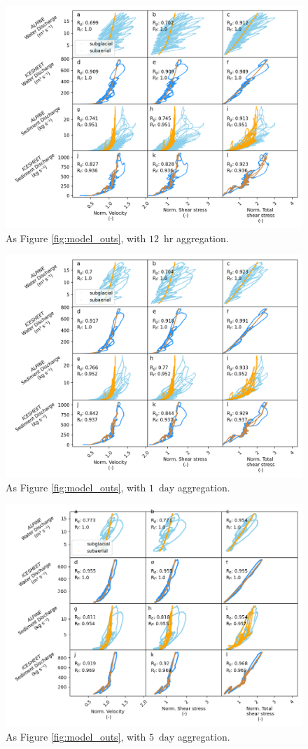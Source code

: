 \documentclass[11pt]{article}
\newcommand{\unit}[1]{$\mathrm{#1}$}
\begin{document}
\begin{center}
  \begin{figure}[h]
    \includegraphics[width=0.7\linewidth]{Fig3_12hr.png}
    \caption{As Figure \ref{fig:model_outs}, with $12$ \,\unit{hr} aggregation.} 
    \label{fig:model_outs_12hr}
  \end{figure}
\end{center}


\begin{center}
  \begin{figure}[h]
    \includegraphics[width=0.7\linewidth]{Fig3_1day.png}
    \caption{As Figure \ref{fig:model_outs}, with $1$ \,\unit{day} aggregation.} 
    \label{fig:model_outs_1day}
  \end{figure}
\end{center}


\begin{center}
  \begin{figure}[h]
    \includegraphics[width=0.7\linewidth]{Fig3_5day.png}
    \caption{As Figure \ref{fig:model_outs}, with $5$ \,\unit{day} aggregation.} 
    \label{fig:model_outs_5day}
  \end{figure}
\end{center}
\end{document}
